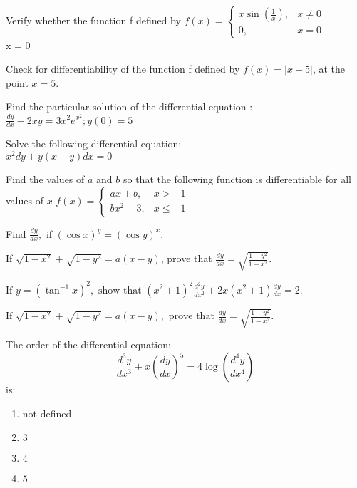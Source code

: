 \item Verify whether the function f defined by $f(x) = \begin{cases} x \sin{\left(\frac{1}{x}\right)}, & x \neq 0 \\ 0, & x = 0 \end{cases} $\\
 x = 0 


\item Check for differentiability  of the function f defined by $f(x) = |x-5|$, at the point $x = 5$.


\item Find the particular solution of the  differential equation : \\
	$ \frac{dy}{dx} - 2xy = 3x^2e^{x^2} ; y(0)=5 $

\item Solve the following differential equation:\\
	$x^2 dy+y(x+y)dx=0$

\item Find the values of $a$ and $b$ so that the following function is differentiable for all values of $x$  $f(x) = \begin{cases} ax+b, & x>-1 \\ bx^2-3, & x\le -1 \end{cases} $

\item Find $ \frac{dy}{dx},$ if $(\cos{x})^y = (\cos{y})^x.$
\item If $\sqrt{1-x^2} + \sqrt{1-y^2} =a(x-y)$, prove that $ \frac{dy}{dx}= \sqrt{\frac{1-y^2}{1-x^2}}.$

\item $\text{If } y = (\tan^{-1}x)^2, \text{ show that } (x^2+1)^2 \frac{d^2y}{dx^2} + 2x(x^2+1) \frac{dy}{dx} = 2.$

\item $\text{If } \sqrt{1-x^2} + \sqrt{1-y^2} = a(x-y), \text{ prove that } \frac{dy}{dx} = \sqrt{\frac{1-y^2}{1-x^2}} .$

    \item The order of the differential equation:
    $$
    \frac{d^3 y}{dx^3} + x \left( \frac{dy}{dx} \right)^5 = 4 \log \left( \frac{d^4 y}{dx^4} \right)
    $$
    is:
    \begin{enumerate}[label=(\alph*)]
        \item not defined
        \item $3$
        \item $4$
        \item $5$
    \end{enumerate}

